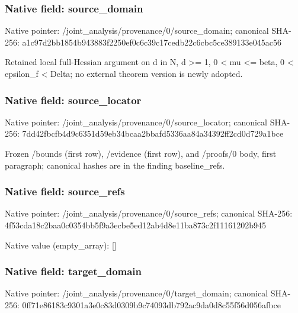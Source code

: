 \documentclass[10pt,a4paper]{article}
\begin{document}
\subsubsection{Native field: source\_\allowbreak{}domain}
Native pointer: /joint\_\allowbreak{}analysis/provenance/0/source\_\allowbreak{}domain; canonical SHA-256: a1c97d2bb1854b943883f2250ef0c6c39c17cedb22c6cbc5ce389133e045ac56

\begingroup\raggedright\sloppy Retained local full-Hessian argument on d in N,\allowbreak{} d >=\allowbreak{} 1,\allowbreak{} 0 < mu <=\allowbreak{} beta,\allowbreak{} 0 < epsilon\_\allowbreak{}f < Delta;\allowbreak{} no external theorem version is newly adopted.\par\endgroup

\subsubsection{Native field: source\_\allowbreak{}locator}
Native pointer: /joint\_\allowbreak{}analysis/provenance/0/source\_\allowbreak{}locator; canonical SHA-256: 7dd42fbcfb4d9c6351d59eb34bcaa2bbafd5336aa84a34392ff2cd0d729a1bce

\begingroup\raggedright\sloppy Frozen /\allowbreak{}bounds (first row),\allowbreak{} /\allowbreak{}evidence (first row),\allowbreak{} and /\allowbreak{}proofs/\allowbreak{}0 body,\allowbreak{} first paragraph;\allowbreak{} canonical hashes are in the finding baseline\_\allowbreak{}refs.\par\endgroup

\subsubsection{Native field: source\_\allowbreak{}refs}
Native pointer: /joint\_\allowbreak{}analysis/provenance/0/source\_\allowbreak{}refs; canonical SHA-256: 4f53cda18c2baa0c0354bb5f9a3ecbe5ed12ab4d8e11ba873c2f11161202b945

Native value (empty\_\allowbreak{}array): []

\subsubsection{Native field: target\_\allowbreak{}domain}
Native pointer: /joint\_\allowbreak{}analysis/provenance/0/target\_\allowbreak{}domain; canonical SHA-256: 0ff71e86183c9301a3e0c83d0309b9c74093db792ac9da0d8c55f56d056afbce
\end{document}
